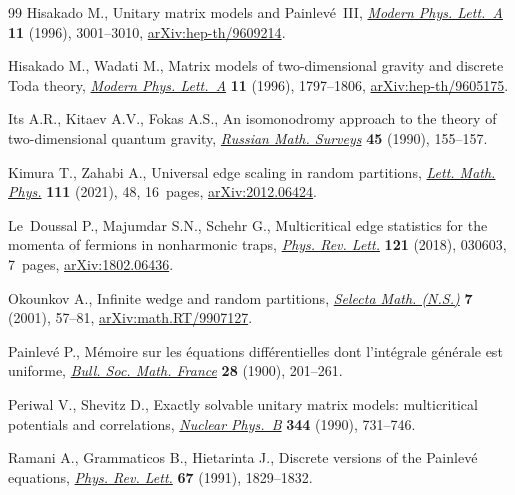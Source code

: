 \documentclass[pdftex]{sigma}%
\numberwithin{equation}{section}
\begin{document}
\begin{thebibliography}{99}
Hisakado M., Unitary matrix models and {P}ainlev\'e~{III}, \href{https://doi.org/10.1142/S0217732396002976}{\textit{Modern Phys.
 Lett.~A}} \textbf{11} (1996), 3001--3010, \href{https://arxiv.org/abs/hep-th/9609214}{arXiv:hep-th/9609214}.

Hisakado M., Wadati M., Matrix models of two-dimensional gravity and discrete
 {T}oda theory, \href{https://doi.org/10.1142/S0217732396001788}{\textit{Modern Phys. Lett.~A}} \textbf{11} (1996), 1797--1806,
 \href{https://arxiv.org/abs/hep-th/9605175}{arXiv:hep-th/9605175}.

Its A.R., Kitaev A.V., Fokas A.S., An isomonodromy approach to the theory of
 two-dimensional quantum gravity, \href{https://doi.org/10.1070/RM1990v045n06ABEH002699}{\textit{Russian Math. Surveys}} \textbf{45}
 (1990), 155--157.

Kimura T., Zahabi A., Universal edge scaling in random partitions,
 \href{https://doi.org/10.1007/s11005-021-01389-y}{\textit{Lett. Math. Phys.}} \textbf{111} (2021), 48, 16~pages,
 \href{https://arxiv.org/abs/2012.06424}{arXiv:2012.06424}.

Le~Doussal P., Majumdar S.N., Schehr G., Multicritical edge statistics for the
 momenta of fermions in nonharmonic traps, \href{https://doi.org/10.1103/PhysRevLett.121.030603}{\textit{Phys. Rev. Lett.}}
 \textbf{121} (2018), 030603, 7~pages, \href{https://arxiv.org/abs/1802.06436}{arXiv:1802.06436}.

Okounkov A., Infinite wedge and random partitions, \href{https://doi.org/10.1007/PL00001398}{\textit{Selecta Math.
 (N.S.)}} \textbf{7} (2001), 57--81, \href{https://arxiv.org/abs/math.RT/9907127}{arXiv:math.RT/9907127}.

Painlev\'e P., M\'emoire sur les \'equations diff\'erentielles dont
 l'int\'egrale g\'en\'erale est uniforme, \href{https://doi.org/10.24033/bsmf.633}{\textit{Bull. Soc. Math. France}}
 \textbf{28} (1900), 201--261.

Periwal V., Shevitz D., Exactly solvable unitary matrix models: multicritical
 potentials and correlations, \href{https://doi.org/10.1016/0550-3213(90)90676-5}{\textit{Nuclear Phys.~B}} \textbf{344} (1990),
 731--746.

Ramani A., Grammaticos B., Hietarinta J., Discrete versions of the {P}ainlev\'e
 equations, \href{https://doi.org/10.1103/PhysRevLett.67.1829}{\textit{Phys. Rev. Lett.}} \textbf{67} (1991), 1829--1832.


\end{thebibliography}
\end{document}
